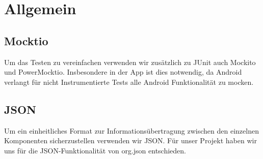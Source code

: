\section{Allgemein}
\subsection{Mocktio}
Um das Testen zu vereinfachen verwenden wir zusätzlich zu JUnit auch Mockito und PowerMocktio. Insbesondere in der App ist dies notwendig, da Android verlangt für nicht Instrumentierte Tests alle Android Funktionalität zu mocken.

\subsection{JSON}
Um ein einheitliches Format zur Informationsübertragung zwischen den einzelnen Komponenten sicherzustellen verwenden wir JSON. Für unser Projekt haben wir uns für die JSON-Funktionalität von org.json entschieden.